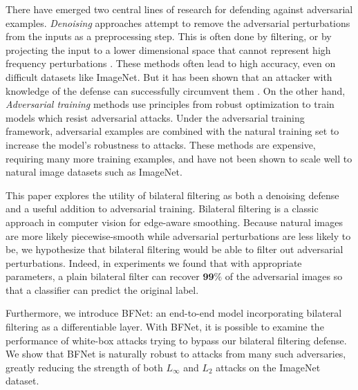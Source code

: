 \documentclass{article} %
\begin{document}
There have emerged two central lines of research for defending against adversarial examples. \textit{Denoising} approaches attempt to remove the adversarial perturbations from the inputs as a preprocessing step. This is often done by filtering, or by projecting the input to a lower dimensional space that cannot represent high frequency perturbations \citep{samangouei2018defense,shen2017ape}. These methods often lead to high accuracy, even on difficult datasets like ImageNet. But it has been shown that an attacker with knowledge of the defense can successfully circumvent them \citep{athalye2018obfuscated}. On the other hand, \textit{Adversarial training} methods use principles from robust optimization to train models which resist adversarial attacks. Under the adversarial training framework, adversarial examples are combined with the natural training set to increase the model's robustness to attacks. These methods are expensive, requiring many more training examples, and have not been shown to scale well to natural image datasets such as ImageNet. 

This paper explores the utility of bilateral filtering as both a denoising defense and a useful addition to adversarial training. Bilateral filtering is a classic approach in computer vision for edge-aware smoothing. Because natural images are more likely piecewise-smooth while adversarial perturbations are less likely to be, we hypothesize that bilateral filtering would be able to filter out adversarial perturbations. Indeed, in experiments we found that with appropriate parameters, a plain bilateral filter can recover $\textbf{99\%}$ of the adversarial images so that a classifier can predict the original label. 

Furthermore, we introduce BFNet: an end-to-end model incorporating bilateral filtering as a differentiable layer. With BFNet, it is possible to examine the performance of white-box attacks trying to bypass our bilateral filtering defense. We show that BFNet is naturally robust to attacks from many such adversaries, greatly reducing the strength of both $L_\infty$ and $L_2$ attacks on the ImageNet dataset.
\end{document}
